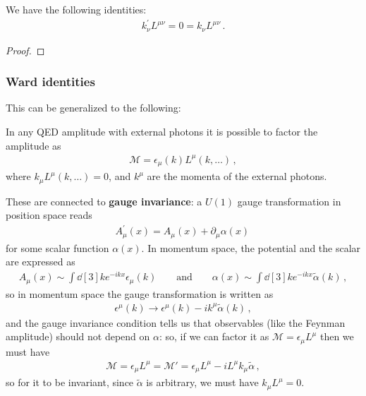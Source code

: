 \documentclass[main.tex]{subfiles}
\begin{document}
\begin{claim}
We have the following identities: 
%
\begin{align}
k^{\prime }_{\nu } L^{\mu \nu } = 0 = k_\nu L^{\mu \nu }
\,.
\end{align}
\end{claim}

\begin{proof}
\end{proof}

\subsubsection{Ward identities}

This can be generalized to the following: 
\begin{claim}
In any QED amplitude with external photons it is possible to factor the amplitude as 
%
\begin{align}
\mathcal{M} = \epsilon_{\mu } (k) L^{\mu } (k, \dots)
\,,
\end{align}
%
where \(k_\mu L^{\mu } (k, \dots) = 0\), and \(k^{\mu }\) are the momenta of the external photons.

\end{claim}

These are connected to \textbf{gauge invariance}: a \(U(1)\) gauge transformation in position space reads 
%
\begin{align}
A^{\prime }_{\mu } (x) = A_{\mu } (x) + \partial_{\mu} \alpha (x)
\,
\end{align}
%
for some scalar function \(\alpha (x)\). In momentum space, the potential and the scalar are expressed as 
%
\begin{align}
A_{\mu } (x) \sim \int \dd[3]{k} e^{-ikx} \epsilon_{\mu } (k) 
\qquad \text{and} \qquad
\alpha (x) \sim \int \dd[3]{k} e^{-ikx} \widetilde{\alpha}(k)
\,,
\end{align}
%
so in momentum space the gauge transformation is written as 
%
\begin{align}
\epsilon^{\mu }(k) \to \epsilon^{\mu }(k) - i k^{\mu } \widetilde{\alpha} (k)
\,,
\end{align}
%
and the gauge invariance condition tells us that observables (like the Feynman amplitude) should not depend on \(\alpha\): so, if we can factor it as \(\mathcal{M} = \epsilon_{\mu } L^{\mu }\) then we must have 
%
\begin{align}
\mathcal{M} = \epsilon_{\mu } L^{\mu }
= \mathcal{M}' = \epsilon_{\mu } L^{\mu } - i L^{\mu } k_{\mu } \widetilde{\alpha}
\,,
\end{align}
%
so for it to be invariant, since \(\widetilde{\alpha} \) is arbitrary, we must have \(k_{\mu } L^{\mu } = 0\).
\end{document}
